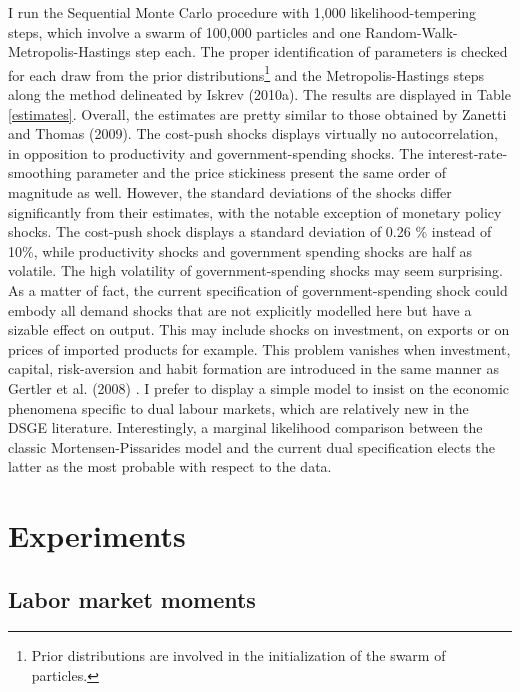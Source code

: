 \documentclass[a4paper]{article}
\begin{document}
I run the Sequential Monte Carlo procedure with 1,000 likelihood-tempering steps, which involve a swarm of 100,000 particles and one Random-Walk-Metropolis-Hastings step each. The proper identification of parameters is checked for each draw from the prior distributions\footnote{Prior distributions are involved in the initialization of the swarm of particles.} and the Metropolis-Hastings steps along the method delineated by Iskrev (2010a). The results are displayed in Table \ref{estimates}. Overall, the estimates are pretty similar to those obtained by Zanetti and Thomas (2009). The cost-push shocks displays virtually no autocorrelation, in opposition to productivity and government-spending shocks. The interest-rate-smoothing parameter and the price stickiness present the same order of magnitude as well. However, the standard deviations of the shocks differ significantly from their estimates, with the notable exception of monetary policy shocks. The cost-push shock displays a standard deviation of 0.26 \% instead of 10\%, while productivity shocks and government spending shocks are half as volatile. The high volatility of government-spending shocks may seem surprising. As a matter of fact, the current specification of government-spending shock could embody all demand shocks that are not explicitly modelled here but have a sizable effect on output. This may include shocks on investment, on exports or on prices of imported products for example. This problem vanishes when investment, capital, risk-aversion and habit formation are introduced in the same manner as Gertler et al. (2008) \cite{gertler2008estimated}. I prefer to display a simple model to insist on the economic phenomena specific to dual labour markets, which are relatively new in the DSGE literature. Interestingly, a marginal likelihood comparison between the classic Mortensen-Pissarides model and the current dual specification elects the latter as the most probable with respect to the data.

\section{Experiments}

\subsection{Labor market moments}
\end{document}
